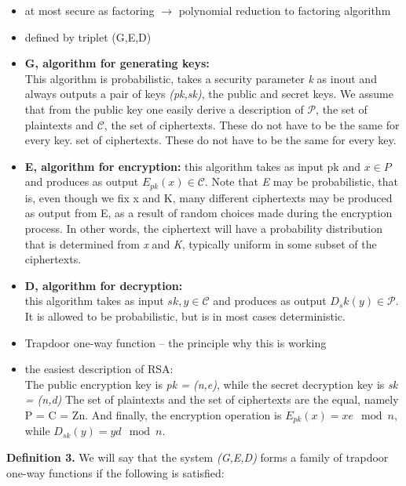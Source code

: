 \documentclass[a4paper,10pt]{article}
\begin{document}
\begin{itemize}
\item at most secure as factoring $\rightarrow$ polynomial reduction to factoring algorithm	
\item defined by triplet (G,E,D)
\item \textbf{G, algorithm for generating keys:}\\
 This algorithm is probabilistic, takes a security parameter \textit{k} as inout and always outputs a pair of keys \textit{(pk,sk)}, the public and secret keys. We assume
that from the public key one easily derive a description of $\mathcal{P}$, the set of plaintexts and $\mathcal{C}$, the
set of ciphertexts. These do not have to be the same for every key.
set of ciphertexts. These do not have to be the same for every key.
\item 
\textbf{E, algorithm for encryption:} this algorithm takes as input pk and $x \in P$ and produces as
output $E_{pk}(x) \in \mathcal{C}$. Note that \textit{E} may be probabilistic, that is, even though we fix x and K, many
different ciphertexts may be produced as output from E, as a result of random choices made during the encryption process. In other words, the ciphertext will have a probability distribution that is determined from \textit{x} and \textit{K}, typically uniform in some subset of the ciphertexts.
\item
\textbf{D, algorithm for decryption:}\\
this algorithm takes as input $sk,y \in \mathcal{C}$ and produces as output $D_sk(y) \in \mathcal{P}$. It is allowed to be probabilistic, but is in most cases deterministic.
\end{itemize}
\begin{itemize}
\item Trapdoor one-way function -- the principle why this is working
\item the easiest description of RSA:\\
The public encryption key is \textit{pk = (n,e)}, while the secret decryption key is \textit{sk = (n,d)} The
set of plaintexts and the set of ciphertexts are the equal, namely P = C = Zn. And finally, the encryption operation is $E_{pk}(x) = xe \mod n$, while $D_{sk}(y) = yd\mod n$.
\end{itemize}
\textbf{Definition 3.} We will say that the system \textit{(G,E,D)} forms a family of trapdoor one-way functions
if the following is satisfied:
\end{document}
